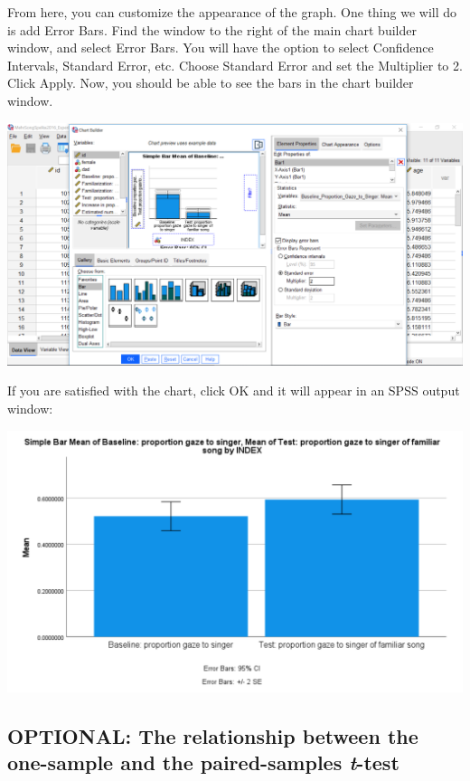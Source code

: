 \documentclass[
]{book}
\begin{document}
From here, you can customize the appearance of the graph. One thing we will do is add Error Bars. Find the window to the right of the main chart builder window, and select {Error Bars}. You will have the option to select Confidence Intervals, Standard Error, etc. Choose {Standard Error} and set the {Multiplier to 2}. Click {Apply}. Now, you should be able to see the bars in the chart builder window.

\includegraphics{img/6.4.29.png}

If you are satisfied with the chart, click OK and it will appear in an SPSS output window:

\includegraphics{img/6.4.30.png}

\hypertarget{optional-the-relationship-between-the-one-sample-and-the-paired-samples-t-test}{%
\subsection{\texorpdfstring{OPTIONAL: The relationship between the one-sample and the paired-samples \emph{t}-test}{OPTIONAL: The relationship between the one-sample and the paired-samples t-test}}\label{optional-the-relationship-between-the-one-sample-and-the-paired-samples-t-test}}
\end{document}
